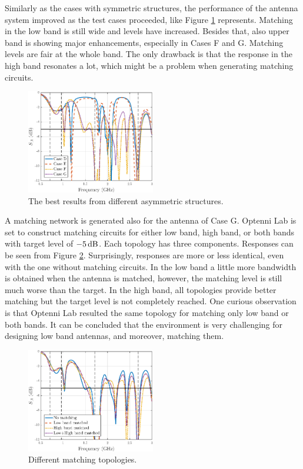 Similarly as the cases with symmetric structures, the performance of the antenna system improved as the test cases proceeded, like Figure \ref{fig:concept3} represents. Matching in the low band is still wide and levels have increased. Besides that, also upper band is showing major enhancements, especially in Cases F and G. Matching levels are fair at the whole band. The only drawback is that the response in the high band resonates a lot, which might be a problem when generating matching circuits.
\begin{figure}[H]
    \centering
    \includegraphics[width=0.5\textwidth]{img/concept3.eps}
    \caption{The best results from different asymmetric structures.}
    \label{fig:concept3}
\end{figure}

A matching network is generated also for the antenna of Case G. Optenni Lab is set to construct matching circuits for either low band, high band, or both bands with target level of $-5\,\mathrm{dB}$. Each topology has three components. Responses can be seen from Figure \ref{fig:concept3_match}. Surprisingly, responses are more or less identical, even with the one without matching circuits. In the low band a little more bandwidth is obtained when the antenna is matched, however, the matching level is still much worse than the target. In the high band, all topologies provide better matching but the target level is not completely reached. One curious observation is that Optenni Lab resulted the same topology for matching only low band or both bands. It can be concluded that the environment is very challenging for designing low band antennas, and moreover, matching them.
\begin{figure}[H]
    \centering
    \includegraphics[width=0.5\textwidth]{img/concept3_match.eps}
    \caption{Different matching topologies.}
    \label{fig:concept3_match}
\end{figure}

